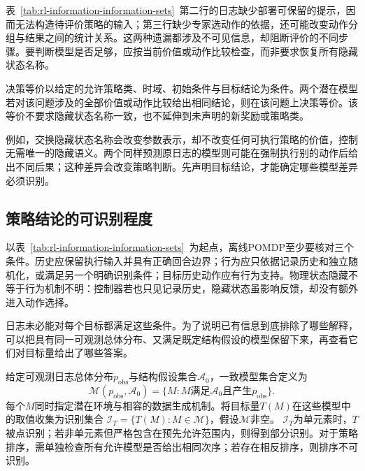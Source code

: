 表~\ref{tab:rl-information-information-sets}~第二行的日志缺少部署可保留的提示，因而无法构造待评价策略的输入；第三行缺少专家选动作的依据，还可能改变动作分组与结果之间的统计关系。这两种遗漏都涉及不可见信息，却阻断评价的不同步骤。要判断模型是否足够，应按当前价值或动作比较检查，而非要求恢复所有隐藏状态名称。

\begin{definition}[给定问题上的决策等价]
  \label{def:rl-information-decision-equivalence}
  决策等价以给定的允许策略类、时域、初始条件与目标结论为条件。两个潜在模型若对该问题涉及的全部价值或动作比较给出相同结论，则在该问题上决策等价。该等价不要求隐藏状态名称一致，也不延伸到未声明的新奖励或策略类。
\end{definition}

例如，交换隐藏状态名称会改变参数表示，却不改变任何可执行策略的价值，控制无需唯一的隐藏语义。两个同样预测原日志的模型则可能在强制执行别的动作后给出不同后果；这种差异会改变策略判断。先声明目标结论，才能确定哪些模型差异必须识别。

\subsection{策略结论的可识别程度}
\label{sec:rl-information-identification-levels}

以表~\ref{tab:rl-information-information-sets}~为起点，离线POMDP至少要核对三个条件。历史应保留执行输入并具有正确回合边界；行为应只依据记录历史和独立随机化，或满足另一个明确识别条件；目标历史动作应有行为支持。物理状态隐藏不等于行为机制不明：控制器若也只见记录历史，隐藏状态虽影响反馈，却没有额外进入动作选择。

日志未必能对每个目标都满足这些条件。为了说明已有信息到底排除了哪些解释，可以把具有同一可观测总体分布、又满足既定结构假设的模型保留下来，再查看它们对目标量给出了哪些答案。

\begin{definition}[一致模型集合与识别集合]
  \label{def:rl-information-identified-set}
  给定可观测日志总体分布$p_{\mathrm{obs}}$与结构假设集合$\mathcal A_0$，一致模型集合定义为
  \[
    \mathcal M(p_{\mathrm{obs}},\mathcal A_0)
       =\{M:M\text{满足}\mathcal A_0
                  \text{且产生}p_{\mathrm{obs}}\}.
  \]
  每个$M$同时指定潜在环境与相容的数据生成机制。将目标量$T(M)$在这些模型中的取值收集为识别集合
  $\mathcal I_T=\{T(M):M\in\mathcal M\}$，假设$\mathcal M$非空。
  $\mathcal I_T$为单元素时，$T$被点识别；若非单元素但严格包含在预先允许范围内，则得到部分识别。对于策略排序，需单独检查所有允许模型是否给出相同次序；若存在相反排序，则排序不可识别。
\end{definition}

